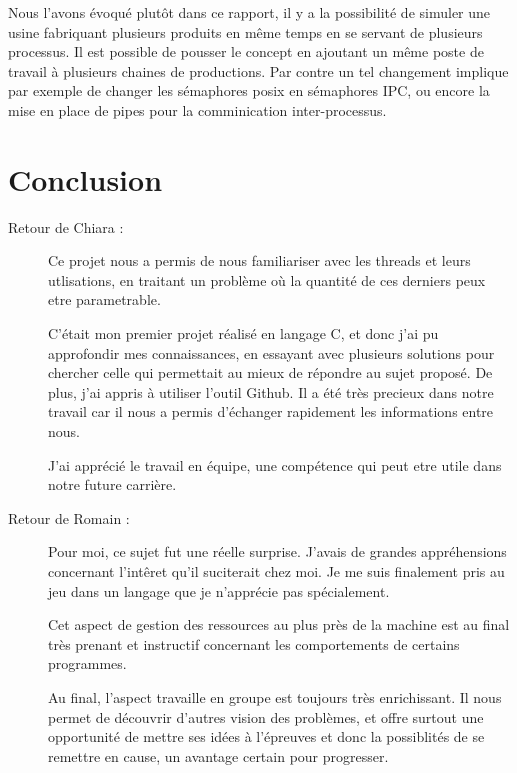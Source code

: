 \documentclass[11pt]{report}
\begin{document}
	Nous l'avons évoqué plutôt dans ce rapport, il y a la possibilité de simuler une usine fabriquant plusieurs produits en même temps en se servant de plusieurs processus. Il est possible de pousser le concept en ajoutant un même poste de travail à plusieurs chaines de productions. Par contre un tel changement implique par exemple de changer les sémaphores posix en sémaphores IPC, ou encore la mise en place de pipes pour la comminication inter-processus.
\chapter{Conclusion}
\begin{description}
\item[Retour de Chiara : ]Ce projet nous a permis de nous familiariser avec les threads et leurs utlisations, en traitant un problème où la quantité de ces derniers peux etre parametrable.

C'était mon premier projet réalisé en langage C, et donc j'ai pu approfondir mes connaissances,
en essayant avec plusieurs solutions pour chercher celle qui permettait au mieux de répondre
au sujet proposé. De plus, j'ai appris à utiliser l'outil Github. Il a été très precieux dans notre
travail car il nous a permis d'échanger rapidement les informations entre nous.

J'ai apprécié le travail en équipe, une compétence qui peut etre utile dans notre future carrière.
\item[Retour de Romain : ]Pour moi, ce sujet fut une réelle surprise. J'avais de grandes appréhensions concernant l'intêret qu'il suciterait chez moi. Je me suis finalement pris au jeu dans un langage que je n'apprécie pas spécialement.

Cet aspect de gestion des ressources au plus près de la machine est au final très prenant et instructif concernant les comportements de certains programmes. 

Au final, l'aspect travaille en groupe est toujours très enrichissant. Il nous permet de découvrir d'autres vision des problèmes, et offre surtout une opportunité de mettre ses idées à l'épreuves et donc la possiblités de se remettre en cause, un avantage certain pour progresser.
\end{description}
\end{document}
